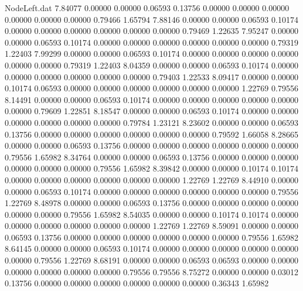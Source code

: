 \begin{filecontents}{NodeLeft.dat}
   7.84077    0.00000    0.00000     0.06593    0.13756    0.00000    0.00000    0.00000    0.00000    0.00000    0.00000    0.79466    1.65794
   7.88146    0.00000    0.00000     0.06593    0.10174    0.00000    0.00000    0.00000    0.00000    0.00000    0.00000    0.79469    1.22635
   7.95247    0.00000    0.00000     0.06593    0.10174    0.00000    0.00000    0.00000    0.00000    0.00000    0.00000    0.79319    1.22403
   7.99299    0.00000    0.00000     0.06593    0.10174    0.00000    0.00000    0.00000    0.00000    0.00000    0.00000    0.79319    1.22403
   8.04359    0.00000    0.00000     0.06593    0.10174    0.00000    0.00000    0.00000    0.00000    0.00000    0.00000    0.79403    1.22533
   8.09417    0.00000    0.00000     0.10174    0.06593    0.00000    0.00000    0.00000    0.00000    0.00000    0.00000    1.22769    0.79556
   8.14491    0.00000    0.00000     0.06593    0.10174    0.00000    0.00000    0.00000    0.00000    0.00000    0.00000    0.79609    1.22851
   8.18547    0.00000    0.00000     0.06593    0.10174    0.00000    0.00000    0.00000    0.00000    0.00000    0.00000    0.79784    1.23121
   8.23602    0.00000    0.00000     0.06593    0.13756    0.00000    0.00000    0.00000    0.00000    0.00000    0.00000    0.79592    1.66058
   8.28665    0.00000    0.00000     0.06593    0.13756    0.00000    0.00000    0.00000    0.00000    0.00000    0.00000    0.79556    1.65982
   8.34764    0.00000    0.00000     0.06593    0.13756    0.00000    0.00000    0.00000    0.00000    0.00000    0.00000    0.79556    1.65982
   8.39842    0.00000    0.00000     0.10174    0.10174    0.00000    0.00000    0.00000    0.00000    0.00000    0.00000    1.22769    1.22769
   8.44910    0.00000    0.00000     0.06593    0.10174    0.00000    0.00000    0.00000    0.00000    0.00000    0.00000    0.79556    1.22769
   8.48978    0.00000    0.00000     0.06593    0.13756    0.00000    0.00000    0.00000    0.00000    0.00000    0.00000    0.79556    1.65982
   8.54035    0.00000    0.00000     0.10174    0.10174    0.00000    0.00000    0.00000    0.00000    0.00000    0.00000    1.22769    1.22769
   8.59091    0.00000    0.00000     0.06593    0.13756    0.00000    0.00000    0.00000    0.00000    0.00000    0.00000    0.79556    1.65982
   8.64145    0.00000    0.00000     0.06593    0.10174    0.00000    0.00000    0.00000    0.00000    0.00000    0.00000    0.79556    1.22769
   8.68191    0.00000    0.00000     0.06593    0.06593    0.00000    0.00000    0.00000    0.00000    0.00000    0.00000    0.79556    0.79556
   8.75272    0.00000    0.00000     0.03012    0.13756    0.00000    0.00000    0.00000    0.00000    0.00000    0.00000    0.36343    1.65982

\end{filecontents}
